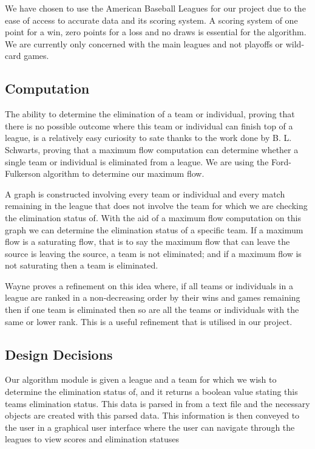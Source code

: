 \documentclass{report}
\begin{document}
We have chosen to use the American Baseball Leagues for our project due to the ease of access to accurate data and its scoring system. A scoring system of one point for a win, zero points for a loss and no draws is essential for the algorithm. We are currently only concerned with the main leagues and not playoffs or wild-card games.

\subsection*{Computation}

The ability to determine the elimination of a team or individual, proving that there is no possible outcome where this team or individual can finish top of a league, is a relatively easy curiosity to sate thanks to the work done by B. L. Schwarts, proving that a maximum flow computation can determine whether a single team or individual is eliminated from a league. We are using the Ford-Fulkerson algorithm to determine our maximum flow. 

A graph is constructed involving every team or individual and every match remaining in the league that does not involve the team for which we are checking the elimination status of. With the aid of a maximum flow computation on this graph we can determine the elimination status of a specific team. If a maximum flow is a saturating flow, that is to say the maximum flow that can leave the source is leaving the source, a team is not eliminated; and if a maximum flow is not saturating then a team is eliminated.

Wayne \cite{Wayne} proves a refinement on this idea where, if all teams or individuals in a league are ranked in a non-decreasing order by their wins and games remaining then if one team is eliminated then so are all the teams or individuals with the same or lower rank. This is a useful refinement that is utilised in our project. 

\subsection*{Design Decisions}

Our algorithm module is given a league and a team for which we wish to determine the elimination status of, and it returns a boolean value stating this teams elimination status. This data is parsed in from a text file and the necessary objects are created with this parsed data. This information is then conveyed to the user in a graphical user interface where the user can navigate through the leagues to view scores and elimination statuses
\end{document}
